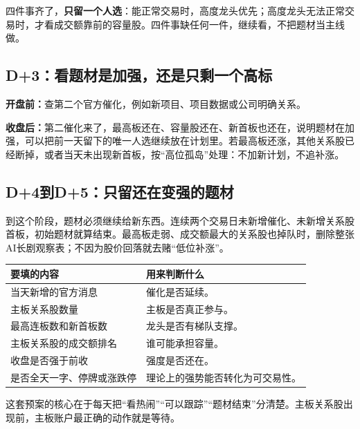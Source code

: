四件事齐了，\textbf{只留一个人选}：能正常交易时，高度龙头优先；高度龙头无法正常交易时，才看成交额靠前的容量股。四件事缺任何一件，继续看，不把题材当主线做。

\subsection*{D+3：看题材是加强，还是只剩一个高标}

\textbf{开盘前：}查第二个官方催化，例如新项目、项目数据或公司明确关系。

\textbf{收盘后：}第二催化来了，最高板还在、容量股还在、新首板也还在，说明题材在加强，可以把前一天留下的唯一人选继续放在计划里。若最高板还涨，其他关系股已经断掉，或者当天未出现新首板，按“高位孤岛”处理：不加新计划，不追补涨。

\subsection*{D+4到D+5：只留还在变强的题材}

到这个阶段，题材必须继续给新东西。连续两个交易日未新增催化、未新增关系股首板，初始题材就算结束。最高板走弱、成交额最大的关系股也掉队时，删除整张AI长剧观察表；不因为股价回落就去赌“低位补涨”。

\begin{exhibitbox}[展品：每天收盘后只填这六项]
\begin{tabularx}{\textwidth}{L{3.0cm}X}
\toprule
要填的内容 & 用来判断什么 \\
\midrule
当天新增的官方消息 & 催化是否延续。 \\
主板关系股数量 & 主板是否真正参与。 \\
最高连板数和新首板数 & 龙头是否有梯队支撑。 \\
主板关系股的成交额排名 & 谁可能承担容量。 \\
收盘是否强于前收 & 强度是否还在。 \\
是否全天一字、停牌或涨跌停 & 理论上的强势能否转化为可交易性。 \\
\bottomrule
\end{tabularx}
\end{exhibitbox}

这套预案的核心在于每天把“看热闹”“可以跟踪”“题材结束”分清楚。主板关系股出现前，主板账户最正确的动作就是等待。
